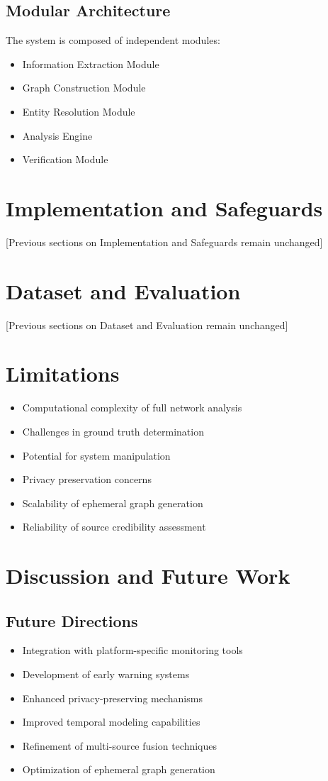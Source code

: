 \documentclass[12pt, a4paper]{article}
\begin{document}
\subsection{Modular Architecture}
The system is composed of independent modules:
\begin{itemize}
    \item Information Extraction Module
    \item Graph Construction Module
    \item Entity Resolution Module
    \item Analysis Engine
    \item Verification Module
\end{itemize}

\section{Implementation and Safeguards}
[Previous sections on Implementation and Safeguards remain unchanged]

\section{Dataset and Evaluation}
[Previous sections on Dataset and Evaluation remain unchanged]

\section{Limitations}
\begin{itemize}
    \item Computational complexity of full network analysis
    \item Challenges in ground truth determination
    \item Potential for system manipulation
    \item Privacy preservation concerns
    \item Scalability of ephemeral graph generation
    \item Reliability of source credibility assessment
\end{itemize}

\section{Discussion and Future Work}
\subsection{Future Directions}
\begin{itemize}
    \item Integration with platform-specific monitoring tools
    \item Development of early warning systems
    \item Enhanced privacy-preserving mechanisms
    \item Improved temporal modeling capabilities
    \item Refinement of multi-source fusion techniques
    \item Optimization of ephemeral graph generation
\end{itemize}
\end{document}
